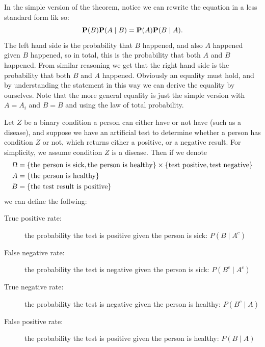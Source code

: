 \documentclass[11pt,a4paper]{article}
\begin{document}
\begin{remark}
  In the simple version of the theorem,
  notice we can rewrite the equation in a less standard form lik so:
  \[
    \mathbf{P}(B) \mathbf{P}(A \mid B) = \mathbf{P}(A) \mathbf{P}(B \mid A).
  \]
  The left hand side is the probability that $B$ happened,
  and also $A$ happened given $B$ happened,
  so in total, this is the probability that both $A$ and $B$ happened.
  From similar reasoning we get that the right hand side
  is the probability that both $B$ and $A$ happened.
  Obviously an equality must hold, and by understanding the statement
  in this way we can derive the equality by ourselves.
  Note that the more general equality is just the simple version
  with $A = A_i$ and $B = B$ and using the law of total probability.
\end{remark}

\begin{definition}
  Let $Z$ be a binary condition a person can either have or not have
  (such as a disease),
  and suppose we have an artificial test to determine whether a person
  has condition $Z$ or not, which returns either a positive, or a negative
  result.
  For simplicity, we assume condition $Z$ is a disease.
  Then if we denote
  \begin{align*}
    \Omega &= \left\{\text{the person is sick}, \text{the person is healthy}\right\} \times \left\{\text{test positive},\text{test negative}\right\} \\
    A &= \left\{\text{the person is healthy}\right\} \\
    B &= \left\{\text{the test result is positive}\right\}
  \end{align*}
  we can define the follwing:
  \begin{description}
    \item[True positive rate:] the probability the test is positive given the person is sick: $P(B \mid A^c)$
    \item[False negative rate:] the probability the test is negative given the person is sick: $P(B^c \mid A^c)$
    \item[True negative rate:] the probability the test is negative given the person is healthy: $P(B^c \mid A)$
    \item[False positive rate:] the probability the test is positive given the person is healthy: $P(B \mid A)$
  \end{description}
\end{definition}
\end{document}
